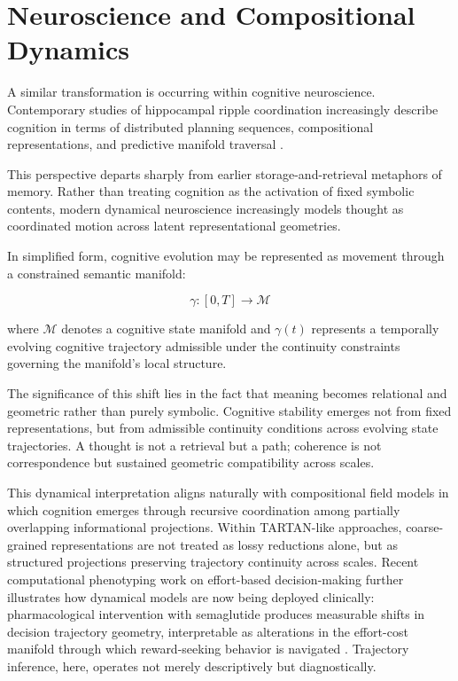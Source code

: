 \documentclass[12pt,a4paper]{article}
\begin{document}
\section{Neuroscience and Compositional Dynamics}

A similar transformation is occurring within cognitive neuroscience. Contemporary
studies of hippocampal ripple coordination increasingly describe cognition in terms
of distributed planning sequences, compositional representations, and predictive
manifold traversal \cite{HippocampalRipples}.

This perspective departs sharply from earlier storage-and-retrieval metaphors of
memory. Rather than treating cognition as the activation of fixed symbolic contents,
modern dynamical neuroscience increasingly models thought as coordinated motion across
latent representational geometries.

In simplified form, cognitive evolution may be represented as movement through a
constrained semantic manifold:

\[
\gamma : [0,T] \rightarrow \mathcal{M}
\]

where $\mathcal{M}$ denotes a cognitive state manifold and $\gamma(t)$ represents a
temporally evolving cognitive trajectory admissible under the continuity constraints
governing the manifold's local structure.

The significance of this shift lies in the fact that meaning becomes relational and
geometric rather than purely symbolic. Cognitive stability emerges not from fixed
representations, but from admissible continuity conditions across evolving state
trajectories. A thought is not a retrieval but a path; coherence is not correspondence
but sustained geometric compatibility across scales.

This dynamical interpretation aligns naturally with compositional field models in
which cognition emerges through recursive coordination among partially overlapping
informational projections. Within TARTAN-like approaches, coarse-grained
representations are not treated as lossy reductions alone, but as structured
projections preserving trajectory continuity across scales. Recent computational
phenotyping work on effort-based decision-making further illustrates how dynamical
models are now being deployed clinically: pharmacological intervention with semaglutide
produces measurable shifts in decision trajectory geometry, interpretable as
alterations in the effort-cost manifold through which reward-seeking behavior is
navigated \cite{Semaglutide}. Trajectory inference, here, operates not merely
descriptively but diagnostically.
\end{document}
